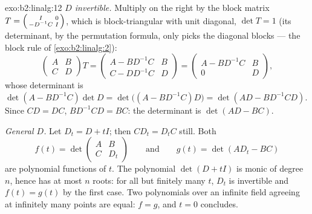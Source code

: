 \begin{solution}{exo:b2:linalg:12}
\emph{$D$ invertible.} Multiply on the right by the block matrix
$T = \begin{psmallmatrix} I & 0\\ -D^{-1}C & I\end{psmallmatrix}$,
which is block-triangular with unit diagonal, $\det T = 1$ (its
determinant, by the permutation formula, only picks the diagonal
blocks --- the block rule of \cref{exo:b2:linalg:2}):
\[
\begin{pmatrix} A & B\\ C & D\end{pmatrix} T
= \begin{pmatrix} A - BD^{-1}C & B\\ C - DD^{-1}C & D\end{pmatrix}
= \begin{pmatrix} A - BD^{-1}C & B\\ 0 & D\end{pmatrix},
\]
whose determinant is $\det(A - BD^{-1}C)\det D = \det\bigl((A -
BD^{-1}C)D\bigr) = \det(AD - BD^{-1}CD)$. Since $CD = DC$,
$BD^{-1}CD = BC$: the determinant is $\det(AD - BC)$.

\emph{General $D$.} Let $D_t = D + tI$; then $CD_t = D_tC$ still.
Both
\[
f(t) = \det\begin{pmatrix} A & B\\ C & D_t\end{pmatrix}
\qquad\text{and}\qquad
g(t) = \det(AD_t - BC)
\]
are polynomial functions of $t$. The polynomial $\det(D + tI)$ is
monic of degree $n$, hence has at most $n$ roots: for all but
finitely many $t$, $D_t$ is invertible and $f(t) = g(t)$ by the
first case. Two polynomials over an infinite field agreeing at
infinitely many points are equal: $f = g$, and $t = 0$ concludes.
\end{solution}

